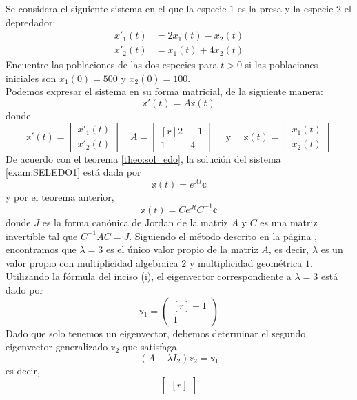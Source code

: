 \begin{example}\label{exam:PRIEEDO1}
    Se considera el siguiente sistema en el que la especie $1$ es la presa y la especie $2$ el depredador:
    \begin{equation}
        \begin{aligned}
            x'_1(t) & = 2x_1(t) - x_2(t) \\
            x'_2(t) & = x_1(t) + 4x_2(t)
        \end{aligned} \label{exam:SELEDO1}
    \end{equation}
    Encuentre las poblaciones de las dos especies para $t > 0$ si las poblaciones iniciales son $x_1(0) = 500$ y $x_2(0) = 100$. \\
    \solucion Podemos expresar el sistema en su forma matricial, de la siguiente manera:
    $$\mathbb{x}'(t) = A\mathbb{x}(t)$$
    donde
    $$\mathbb{x}'(t) = \begin{bmatrix} x'_1(t) \\ x'_2(t) \end{bmatrix} \quad A = \begin{bmatrix*}[r] 2 & -1 \\ 1 & 4 \end{bmatrix*} \quad \text{ y } \quad \mathbb{x}(t) = \begin{bmatrix} x_1(t) \\ x_2(t) \end{bmatrix}$$
    De acuerdo con el teorema \ref{theo:sol_edo}, la solución del sistema \eqref{exam:SELEDO1} está dada por
    $$\mathbb{x}(t) = e^{At} \mathbb{c}$$
    y por el teorema anterior,
    $$\mathbb{x}(t) = Ce^{Jt}C^{-1} \mathbb{c}$$
    donde $J$ es la forma canónica de Jordan de la matriz $A$ y $C$ es una matriz invertible tal que $C^{-1}AC = J$. Siguiendo el método descrito en la página \pageref{metodo_eigen_2x2}, encontramos que $\lambda = 3$ es el único valor propio de la matriz $A$, es decir, $\lambda$ es un valor propio con multiplicidad algebraica $2$ y multiplicidad geométrica $1$. Utilizando la fórmula del inciso (i), el eigenvector correspondiente a $\lambda = 3$ está dado por
    $$\mathbb{v}_1 = \begin{pmatrix*}[r] -1 \\ 1 \end{pmatrix*}$$
    Dado que solo tenemos un eigenvector, debemos determinar el segundo eigenvector generalizado $\mathbb{v}_2$ que satisfaga
    $$(A - \lambda I_2)\mathbb{v}_2 = \mathbb{v}_1$$
    es decir,
    $$\begin{bmatrix*}[r]

\end{bmatrix*}$$
\end{example}
